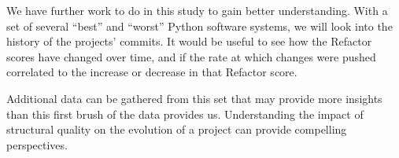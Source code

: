 We have further work to do in this study to gain better understanding. With a set of several ``best'' and ``worst'' Python software systems, we will look into the history of the projects' commits. It would be useful to see how the Refactor scores have changed over time, and if the rate at which changes were pushed correlated to the increase or decrease in that Refactor score. 

Additional data can be gathered from this set that may provide more insights than this first brush of the data provides us. Understanding the impact of structural quality on the evolution of a project can provide compelling perspectives.
